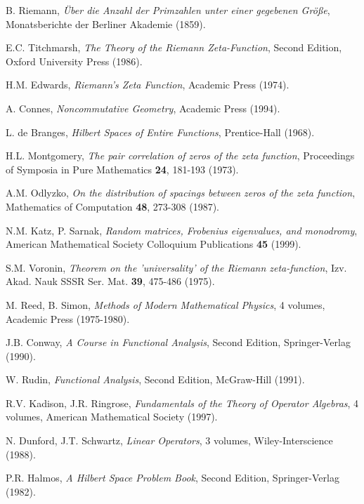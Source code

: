 \documentclass[12pt]{article}
\theoremstyle{plain}
\theoremstyle{definition}
\begin{document}
\begin{thebibliography}{99}

 B. Riemann, \emph{Über die Anzahl der Primzahlen unter einer gegebenen Größe}, Monatsberichte der Berliner Akademie (1859).

 E.C. Titchmarsh, \emph{The Theory of the Riemann Zeta-Function}, Second Edition, Oxford University Press (1986).

 H.M. Edwards, \emph{Riemann's Zeta Function}, Academic Press (1974).

 A. Connes, \emph{Noncommutative Geometry}, Academic Press (1994).

 L. de Branges, \emph{Hilbert Spaces of Entire Functions}, Prentice-Hall (1968).

 H.L. Montgomery, \emph{The pair correlation of zeros of the zeta function}, Proceedings of Symposia in Pure Mathematics \textbf{24}, 181-193 (1973).

 A.M. Odlyzko, \emph{On the distribution of spacings between zeros of the zeta function}, Mathematics of Computation \textbf{48}, 273-308 (1987).

 N.M. Katz, P. Sarnak, \emph{Random matrices, Frobenius eigenvalues, and monodromy}, American Mathematical Society Colloquium Publications \textbf{45} (1999).

 S.M. Voronin, \emph{Theorem on the 'universality' of the Riemann zeta-function}, Izv. Akad. Nauk SSSR Ser. Mat. \textbf{39}, 475-486 (1975).

 M. Reed, B. Simon, \emph{Methods of Modern Mathematical Physics}, 4 volumes, Academic Press (1975-1980).

 J.B. Conway, \emph{A Course in Functional Analysis}, Second Edition, Springer-Verlag (1990).

 W. Rudin, \emph{Functional Analysis}, Second Edition, McGraw-Hill (1991).

 R.V. Kadison, J.R. Ringrose, \emph{Fundamentals of the Theory of Operator Algebras}, 4 volumes, American Mathematical Society (1997).

 N. Dunford, J.T. Schwartz, \emph{Linear Operators}, 3 volumes, Wiley-Interscience (1988).

 P.R. Halmos, \emph{A Hilbert Space Problem Book}, Second Edition, Springer-Verlag (1982).


\end{thebibliography}
\end{document}
